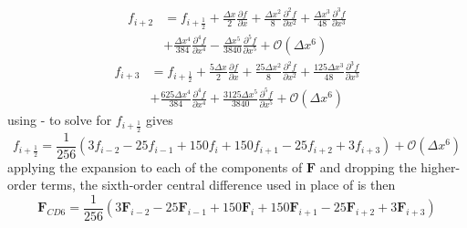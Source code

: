 \begin{equation}
	\begin{split}
		f_{i+2} &= f_{i+\frac{1}{2}} + \frac{\Delta x}{2} \frac{\partial f}{\partial x} + \frac{\Delta x^2}{8} \frac{\partial^2 f}{\partial x^2} + \frac{\Delta x^3}{48} \frac{\partial^3 f}{\partial x^3}\\ &+ \frac{\Delta x^4}{384} \frac{\partial^4 f}{\partial x^4} - \frac{\Delta x^5}{3840} \frac{\partial^5 f}{\partial x^5} + \mathcal{O}\left(\Delta x^6\right)
	\end{split}
\end{equation}
\begin{equation}\label{eqn:fip3CD6}
	\begin{split}
		f_{i+3} &= f_{i+\frac{1}{2}} + \frac{5 \Delta x}{2} \frac{\partial f}{\partial x} + \frac{25 \Delta x^2}{8} \frac{\partial^2 f}{\partial x^2} + \frac{125 \Delta x^3}{48} \frac{\partial^3 f}{\partial x^3}\\ &+ \frac{625 \Delta x^4}{384} \frac{\partial^4 f}{\partial x^4} + \frac{3125 \Delta x^5}{3840} \frac{\partial^5 f}{\partial x^5} + \mathcal{O}\left(\Delta x^6\right)
	\end{split}
\end{equation}
using - to solve for $f_{i+\frac{1}{2}}$ gives
\begin{equation}
	f_{i+\frac{1}{2}} = \frac{1}{256} \left(3 f_{i-2} - 25 f_{i-1} + 150 f_{i} + 150 f_{i+1} - 25 f_{i+2} + 3 f_{i+3}\right) + \mathcal{O}\left(\Delta x^6\right)
\end{equation}
applying the expansion to each of the components of $\boldsymbol{F}$ and dropping the higher-order terms, the sixth-order central difference used in place of  is then
\begin{equation}\label{eqn:CD6}
	\boldsymbol{F}_{CD6} = \frac{1}{256} \left(3 \boldsymbol{F}_{i-2} - 25 \boldsymbol{F}_{i-1} + 150 \boldsymbol{F}_{i} + 150 \boldsymbol{F}_{i+1} - 25 \boldsymbol{F}_{i+2} + 3 \boldsymbol{F}_{i+3}\right)
\end{equation}


